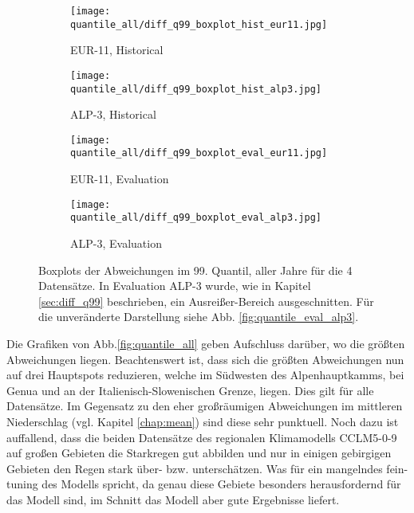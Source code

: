 \begin{figure}[h]
	\begin{subfigure}{0.49\textwidth}
		\texttt{[image: quantile\_all/diff\_q99\_boxplot\_hist\_eur11.jpg]}
		\caption{EUR-11, Historical}
	\end{subfigure}
	\begin{subfigure}{0.49\textwidth}
		\texttt{[image: quantile\_all/diff\_q99\_boxplot\_hist\_alp3.jpg]}
		\caption{ALP-3, Historical}
	\end{subfigure}
	\begin{subfigure}{0.49\textwidth}
		\texttt{[image: quantile\_all/diff\_q99\_boxplot\_eval\_eur11.jpg]}
		\caption{EUR-11, Evaluation}
	\end{subfigure}
	\begin{subfigure}{0.49\textwidth}
		\texttt{[image: quantile\_all/diff\_q99\_boxplot\_eval\_alp3.jpg]}
		\caption{ALP-3, Evaluation}
	\end{subfigure}
	\caption{Boxplots der Abweichungen im 99. Quantil, aller Jahre für die 4 Datensätze. In Evaluation ALP-3 wurde, wie in Kapitel \ref{sec:diff_q99} beschrieben, ein Ausreißer-Bereich ausgeschnitten. Für die unveränderte Darstellung siehe Abb. \ref{fig:quantile_eval_alp3}.}
	\label{fig:quantile_all_boxplots}
\end{figure}

Die Grafiken von Abb.\ref{fig:quantile_all} geben Aufschluss darüber, wo die größten Abweichungen liegen. Beachtenswert ist, dass sich die größten Abweichungen nun auf drei Hauptspots reduzieren, welche im Südwesten des Alpenhauptkamms, bei Genua und an der Italienisch-Slowenischen Grenze, liegen. Dies gilt für alle Datensätze. Im Gegensatz zu den eher großräumigen Abweichungen im mittleren Niederschlag (vgl. Kapitel \ref{chap:mean}) sind diese sehr punktuell. Noch dazu ist auffallend, dass die beiden Datensätze des regionalen Klimamodells CCLM5-0-9 auf großen Gebieten die Starkregen gut abbilden und nur in einigen gebirgigen Gebieten den Regen stark über- bzw. unterschätzen. Was für ein mangelndes fein-tuning des Modells spricht, da genau diese Gebiete besonders herausfordernd für das Modell sind, im Schnitt das Modell aber gute Ergebnisse liefert.\\


